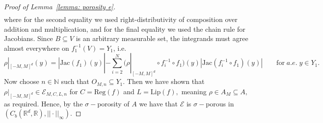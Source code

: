 \documentclass{article}
\newcommand{\R}{\mathbb{R}}
\newcommand{\N}{\mathbb{N}}
\begin{document}
\begin{proof}[Proof of Lemma~\ref{lemma: porosity e}]
\begin{equation*}
\begin{split}
    \end{split}
\end{equation*} where for the second equality we used right-distributivity of composition over addition and multiplication, and for the final equality we used the chain rule for Jacobians. Since $B\subseteq V$ is an arbitrary measurable set, the integrands must agree almost everywhere on $f_1^{-1}(V) = Y_1$, i.e.
\begin{equation*}
      \rho|_{[-M,M]^d}(y) =|\text{Jac}(f_1)(y)|-\sum_{i=2}^N (\rho|_{[-M,M]^d}\circ f_i^{-1}\circ f_1)(y)|\text{Jac}(f_i^{-1} \circ f_1)(y)| \qquad \text{for} \;a.e. \;y \in Y_1.
 \end{equation*} 
 Now choose $n \in \N$ such that $O_{M,n} \subseteq Y_1.$
Then we have shown that $\rho|_{[-M,M]^d} \in \mathcal{E}_{M,C,L,n}$ for $C = \text{Reg}(f)$ and $L = \text{Lip}(f),$ meaning $\rho \in A_M \subseteq A,$ as required. Hence, by the $\sigma-$porosity of $A$ we have that $\mathcal{E}$ is $\sigma-$porous in $(C_b(\R^d,\R), ||\cdot||_{\infty}).$
\end{proof}
\end{document}
